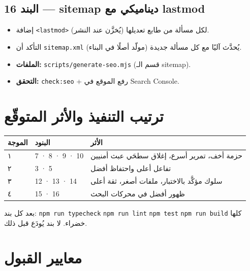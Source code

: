 \documentclass[11pt]{article}
\begin{document}
\subsection{البند 16 — sitemap ديناميكي مع lastmod}

\begin{itemize}
  \item إضافة \texttt{<lastmod>} لكل مسألة من طابع تعديلها (يُخزَّن عند النشر).
  \item التأكد أن \texttt{sitemap.xml} يُحدَّث آليًا مع كل مسألة جديدة (مولّد أصلًا في البناء).
  \item \textbf{الملفات:} \texttt{scripts/generate-seo.mjs} (قسم الـ sitemap).
  \item \textbf{التحقق:} \texttt{check:seo} + رفع الموقع في Search Console.
\end{itemize}

\section{ترتيب التنفيذ والأثر المتوقّع}

\renewcommand{\arraystretch}{1.35}
\begin{longtable}{@{}p{} p{} p{}@{}}
\toprule
\textbf{الموجة} & \textbf{البنود} & \textbf{الأثر} \\
\midrule
\endhead
١ & 7 · 8 · 9 · 10 & حزمة أخف، تمرير أسرع، إغلاق سطحَي عبث أمنيين \\
٢ & 3 · 5 & تفاعل أعلى واحتفاظ أفضل \\
٣ & 12 · 13 · 14 & سلوك مؤكَّد بالاختبار، ملفات أصغر، ثقة أعلى \\
٤ & 15 · 16 & ظهور أفضل في محركات البحث \\
\bottomrule
\end{longtable}
\renewcommand{\arraystretch}{1.0}

\begin{goalbox}
بعد كل بند: \texttt{npm run typecheck} \; \texttt{npm run lint} \; \texttt{npm test} \; \texttt{npm run build}
كلها خضراء. لا بند يُودَع قبل ذلك.
\end{goalbox}

\section{معايير القبول}
\end{document}
